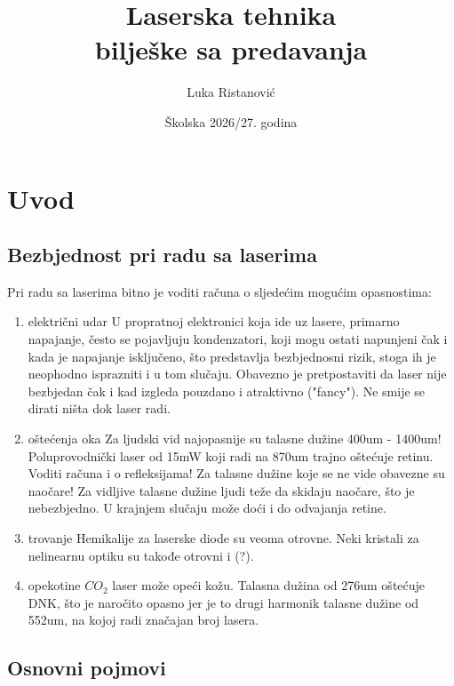 \documentclass[fleqn]{report}
\title{
    Laserska tehnika \\
    \large bilješke sa predavanja
}
\author{Luka Ristanović}
\date{Školska 2026/27. godina}
\begin{document}
\maketitle

\tableofcontents

\chapter{Uvod}

\section{Bezbjednost pri radu sa laserima}

Pri radu sa laserima bitno je voditi računa o sljedećim mogućim opasnostima:
\begin{enumerate}
    \item električni udar
          \subitem U propratnoj elektronici koja ide uz lasere, primarno napajanje, često se pojavljuju kondenzatori, koji mogu ostati napunjeni čak i kada je napajanje isključeno, što predstavlja bezbjednosni rizik, stoga ih je neophodno isprazniti i u tom slučaju.
          Obavezno je pretpostaviti da laser nije bezbjedan čak i kad izgleda pouzdano i atraktivno ("fancy"). Ne smije se dirati ništa dok laser radi.
    \item oštećenja oka
          \subitem Za ljudski vid najopasnije su talasne dužine 400um - 1400um!
          Poluprovodnički laser od 15mW koji radi na 870um trajno oštećuje retinu.
          Voditi računa i o refleksijama!
          Za talasne dužine koje se ne vide obavezne su naočare!
          Za vidljive talasne dužine ljudi teže da skidaju naočare, što je nebezbjedno.
          U krajnjem slučaju može doći i do odvajanja retine.
    \item trovanje
          \subitem Hemikalije za laserske diode su veoma otrovne.
          Neki kristali za nelinearnu optiku su takođe otrovni i (?).
    \item opekotine
          \subitem $CO_2$ laser može opeći kožu.
          Talasna dužina od 276um oštećuje DNK, što je naročito opasno jer je to drugi harmonik talasne dužine od 552um, na kojoj radi značajan broj lasera.
\end{enumerate}

\section{Osnovni pojmovi}
\end{document}
